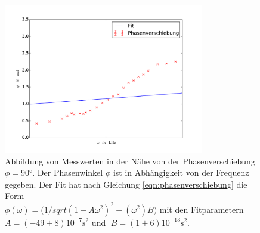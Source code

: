 \begin{figure}
  \centering
  \includegraphics[width=0.78\textwidth]{linphasenverschiebung.pdf}
  \caption{Abbildung von Messwerten in der Nähe von der Phasenverschiebung $\phi=90°$.
          Der Phasenwinkel $\phi$ ist in Abhängigkeit von der Frequenz gegeben.
           Der Fit hat nach Gleichung \eqref{eqn:phasenverschiebung} die Form \\
          $\phi(\omega)=(1/sqrt{(1-A\omega^2)^2+(\omega^2)B)}$
          mit den Fitparametern \\
          $A=(-49\pm8)10^{-7}\si{\second}^2$ und $\;B=(1\pm6)10^{-13}\si{\second}^2$.}
  \label{fig:linphasenverschiebung}
\end{figure}
